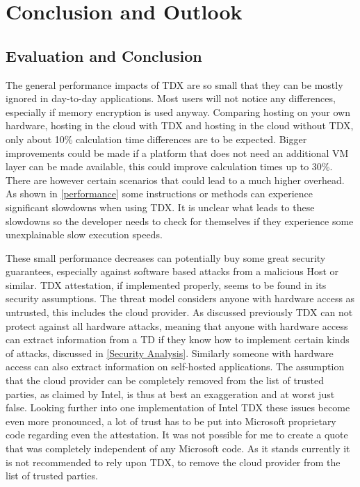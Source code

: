 
\chapter{Conclusion and Outlook}
\label{ch:Conclusion}

\section{Evaluation and Conclusion}

The general performance impacts of TDX are so small that they can be mostly ignored in day-to-day applications. Most users will not notice any differences, especially if memory encryption is used anyway. Comparing hosting on your own hardware, hosting in the cloud with TDX and hosting in the cloud without TDX, only about 10\% calculation time differences are to be expected. Bigger improvements could be made if a platform that does not need an additional VM layer can be made available, this could improve calculation times up to 30\%. There are however certain scenarios that could lead to a much higher overhead. As shown in \cref{performance} some instructions or methods can experience significant slowdowns when using TDX. It is unclear what leads to these slowdowns so the developer needs to check for themselves if they experience some unexplainable slow execution speeds.

These small performance decreases can potentially buy some great security guarantees, especially against software based attacks from a malicious Host or similar. TDX attestation, if implemented properly, seems to be found in its security assumptions. The threat model considers anyone with hardware access as untrusted, this includes the cloud provider. As discussed previously TDX can not protect against all hardware attacks, meaning that anyone with hardware access can extract information from a TD if they know how to implement certain kinds of attacks, discussed in \cref{Security Analysis}. Similarly someone with hardware access can also extract information on self-hosted applications. The assumption that the cloud provider can be completely removed from the list of trusted parties, as claimed by Intel, is thus at best an exaggeration and at worst just false. Looking further into one implementation of Intel TDX these issues become even more pronounced, a lot of trust has to be put into Microsoft proprietary code regarding even the attestation. It was not possible for me to create a quote that was completely independent of any Microsoft code. As it stands currently it is not recommended to rely upon TDX, to remove the cloud provider from the list of trusted parties.


